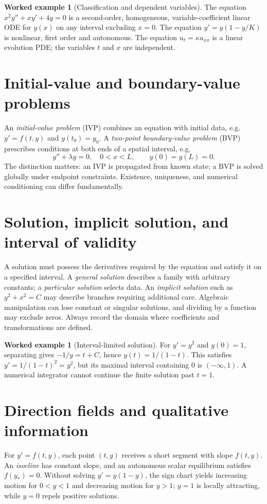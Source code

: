 \documentclass[11pt,letterpaper,oneside]{report}
\theoremstyle{definition}\newtheorem{definition}[theorem]{Definition}
\newtheorem{example}[theorem]{Worked example}
\theoremstyle{remark}\newtheorem{remark}[theorem]{Remark}
\begin{document}
\begin{example}[Classification and dependent variables]
The equation $x^2y''+xy'+4y=0$ is a second-order, homogeneous, variable-coefficient linear ODE for $y(x)$ on any interval excluding $x=0$. The equation $y'=y(1-y/K)$ is nonlinear, first order and autonomous. The equation $u_t=\kappa u_{xx}$ is a linear evolution PDE; the variables $t$ and $x$ are independent.
\end{example}
\section{Initial-value and boundary-value problems}
An \emph{initial-value problem} (IVP) combines an equation with initial data, e.g. $y'=f(t,y)$ and $y(t_0)=y_0$. A \emph{two-point boundary-value problem} (BVP) prescribes conditions at both ends of a spatial interval, e.g.
\[y''+\lambda y=0,\quad 0<x<L,\qquad y(0)=y(L)=0.\]
The distinction matters: an IVP is propagated from known state; a BVP is solved globally under endpoint constraints. Existence, uniqueness, and numerical conditioning can differ fundamentally.
\section{Solution, implicit solution, and interval of validity}
A solution must possess the derivatives required by the equation and satisfy it on a specified interval. A \emph{general solution} describes a family with arbitrary constants; a \emph{particular solution} selects data. An \emph{implicit solution} such as $y^2+x^2=C$ may describe branches requiring additional care. Algebraic manipulation can lose constant or singular solutions, and dividing by a function may exclude zeros. Always record the domain where coefficients and transformations are defined.
\begin{example}[Interval-limited solution]
For $y'=y^2$ and $y(0)=1$, separating gives $-1/y=t+C$, hence $y(t)=1/(1-t)$. This satisfies $y'=1/(1-t)^2=y^2$, but its maximal interval containing $0$ is $(-\infty,1)$. A numerical integrator cannot continue the finite solution past $t=1$.
\end{example}
\section{Direction fields and qualitative information}
For $y'=f(t,y)$, each point $(t,y)$ receives a short segment with slope $f(t,y)$. An \emph{isocline} has constant slope, and an autonomous scalar equilibrium satisfies $f(y_*)=0$. Without solving $y'=y(1-y)$, the sign chart yields increasing motion for $0<y<1$ and decreasing motion for $y>1$; $y=1$ is locally attracting, while $y=0$ repels positive solutions.
\end{document}
